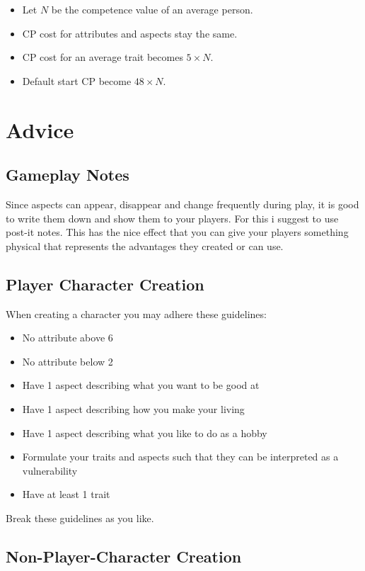 \documentclass[11pt]{article}
\begin{document}
{\begin{itemize}
\item Let \(N\) be the competence value of an average person.
\item CP cost for attributes and aspects stay the same.
\item CP cost for an average trait becomes \(5 \times N\).
\item Default start CP become \(48 \times N\).
\end{itemize}

\newpage
\section{Advice}
\label{sec:orgaceb04c}
\subsection{Gameplay Notes}
\label{sec:org7341621}

Since aspects can appear, disappear and change frequently during play, it is good to write them down and show them to your players. For this i suggest to use post-it notes. This has the nice effect that you can give your players something physical that represents the advantages they created or can use.
\subsection{Player Character Creation}
\label{sec:orgf855d09}

When creating a character you may adhere these guidelines:
\begin{itemize}
\item No attribute above 6
\item No attribute below 2
\item Have 1 aspect describing what you want to be good at
\item Have 1 aspect describing how you make your living
\item Have 1 aspect describing what you like to do as a hobby
\item Formulate your traits and aspects such that they can be interpreted as a vulnerability
\item Have at least 1 trait
\end{itemize}
Break these guidelines as you like.
\subsection{Non-Player-Character Creation}
\label{sec:org6fe90ad}

}
\end{document}
